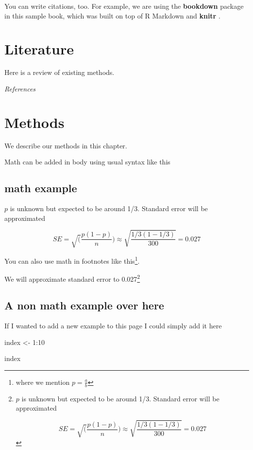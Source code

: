 \documentclass[
]{book}
\newenvironment{Shaded}{\begin{snugshade}}{\end{snugshade}}
\newcommand{\DecValTok}[1]{\textcolor[rgb]{0.00,0.00,0.81}{#1}}
\newcommand{\NormalTok}[1]{#1}
\newcommand{\OtherTok}[1]{\textcolor[rgb]{0.56,0.35,0.01}{#1}}
\newcommand{\SpecialCharTok}[1]{\textcolor[rgb]{0.00,0.00,0.00}{#1}}
\begin{document}
You can write citations, too. For example, we are using the \textbf{bookdown} package \citep{R-bookdown} in this sample book, which was built on top of R Markdown and \textbf{knitr} \citep{xie2015}.

\hypertarget{literature}{%
\chapter{Literature}\label{literature}}

Here is a review of existing methods.

\emph{References}

\hypertarget{methods}{%
\chapter{Methods}\label{methods}}

We describe our methods in this chapter.

Math can be added in body using usual syntax like this

\hypertarget{math-example}{%
\section{math example}\label{math-example}}

\(p\) is unknown but expected to be around 1/3. Standard error will be approximated

\[
SE = \sqrt(\frac{p(1-p)}{n}) \approx \sqrt{\frac{1/3 (1 - 1/3)} {300}} = 0.027
\]

You can also use math in footnotes like this\footnote{where we mention \(p = \frac{a}{b}\)}.

We will approximate standard error to 0.027\footnote{\(p\) is unknown but expected to be around 1/3. Standard error will be approximated

  \[
  SE = \sqrt(\frac{p(1-p)}{n}) \approx \sqrt{\frac{1/3 (1 - 1/3)} {300}} = 0.027
  \]}

\hypertarget{a-non-math-example-over-here}{%
\section{A non math example over here}\label{a-non-math-example-over-here}}

If I wanted to add a new example to this page I could simply add it here

\begin{Shaded}
\begin{Highlighting}[]
\NormalTok{index }\OtherTok{\textless{}{-}} \DecValTok{1}\SpecialCharTok{:}\DecValTok{10}

\NormalTok{index}
\end{Highlighting}
\end{Shaded}
\end{document}

